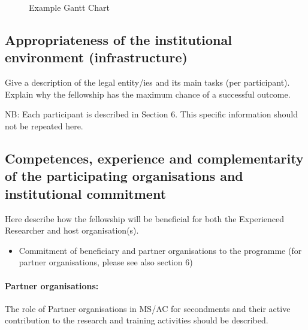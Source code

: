 \begin{figure}[htbp]
\begin{center}
\begin{ganttchart}
\end{ganttchart}

\end{center}
\caption{Example Gantt Chart}
\end{figure}

\subsection{Appropriateness of the institutional environment (infrastructure)}
\label{sec:institution}

Give a description of the legal entity/ies and its main tasks (per participant).
Explain why the fellowship has the maximum chance of a successful outcome.

NB: Each participant is described in Section 6. This specific information should not be repeated here.

\subsection{Competences, experience and complementarity of the participating organisations and institutional commitment}
\label{sec:competences}

Here describe how the fellowship will be beneficial for both the Experienced Researcher and host organisation(s).
\begin{itemize}
\item Commitment of beneficiary and partner organisations to the programme (for partner organisations, please see also section 6)
\end{itemize}

\paragraph{Partner organisations:}
The role of Partner organisations in MS/AC for secondments and their active contribution to the research and training activities should be described.
